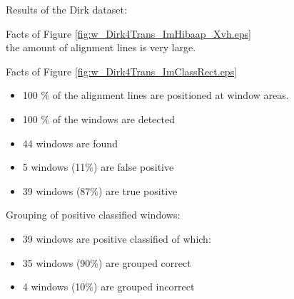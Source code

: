 



Results of the Dirk dataset:\\
\newpage
{}


Facts of Figure \ref{fig:w_Dirk4Trans_ImHibaap_Xvh.eps}\\
the amount of alignment lines is very large.

Facts of Figure \ref{fig:w_Dirk4Trans_ImClassRect.eps}\\
\begin{itemize}
	\item 100 \% of the alignment lines are positioned at window areas.
	\item 100 \% of the windows are detected
	\item 44 windows are found
	\item 5 windows (11\%) are false positive
	\item 39 windows (87\%) are true positive
\end{itemize}

Grouping of positive classified windows:\\
\begin{itemize}
	\item 39 windows are positive classified of which:
	\item 35 windows (90\%) are grouped correct
	\item 4 windows (10\%) are grouped incorrect
\end{itemize}



